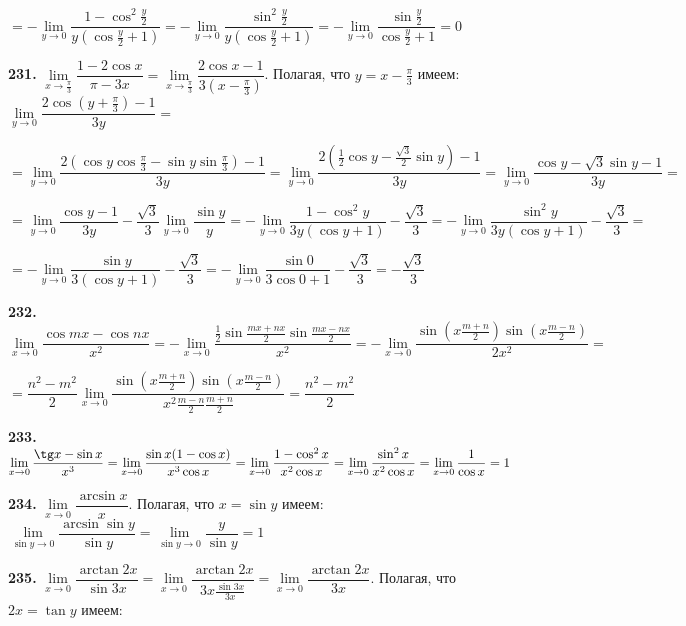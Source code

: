\documentclass[12pt]{article}
\begin{document}
	$
	= -\lim\limits_{y\to0}\dfrac{1-\cos^2\frac{y}{2}}{y(\cos\frac{y}{2}+1)} = - \lim\limits_{y\to0} \dfrac{\sin^2\frac{y}{2}}{y(\cos\frac{y}{2}+1)} = -\lim\limits_{y\to0} \dfrac{\sin \frac{y}{2}}{\cos \frac{y}{2}+1} = 0
	$
	
	\medskip
	{\bf 231.} $\lim\limits_{x\to\frac{\pi}{3}}\dfrac{1-2\cos x}{\pi -3x} = \lim\limits_{x\to\frac{\pi}{3}}\dfrac{2\cos x -1}{3(x-\frac{\pi}{3})}$. Полагая, что $y=x-\frac{\pi}{3}$ имеем: $\lim\limits_{y\to0} \dfrac{2\cos (y+\frac{\pi}{3})-1}{3y} = $
	
	$
	 = \lim\limits_{y\to0} \dfrac{2(\cos y \cos \frac{\pi}{3} - \sin y \sin \frac{\pi}{3})-1}{3y} = \lim\limits_{y\to0} \dfrac{2(\frac{1}{2}\cos y - \frac{\sqrt{3}}{2}\sin y)-1}{3y} = \lim\limits_{y\to0} \dfrac{\cos y - \sqrt{3}\sin y-1}{3y} = 
	$
	
	$
	 = \lim\limits_{y\to0} \dfrac{\cos y - 1}{3y} - \dfrac{\sqrt{3}}{3}\lim\limits_{y\to0} \dfrac{\sin y}{y} = -\lim\limits_{y\to0} \dfrac{1-\cos^2 y}{3y(\cos y+1)} - \dfrac{\sqrt{3}}{3} = -\lim\limits_{y\to0}\dfrac{\sin^2 y}{3y(\cos y+1)}-\dfrac{\sqrt{3}}{3} = 
	$
	
	$
	= -\lim\limits_{y\to0} \dfrac{\sin y}{3(\cos y + 1)} - \dfrac{\sqrt{3}}{3} = -\lim\limits_{y\to0} \dfrac{\sin 0}{3\cos 0 + 1} - \dfrac{\sqrt{3}}{3} = -\dfrac{\sqrt{3}}{3}
	$
	
	\medskip
	{\bf 232.} $\lim\limits_{x\to0}\dfrac{\cos mx- \cos nx}{x^2} = -\lim\limits_{x\to0} \dfrac{\frac{1}{2}\sin \frac{mx+nx}{2}\sin \frac{mx-nx}{2}}{x^2} = -\lim\limits_{x\to0} \dfrac{\sin (x\frac{m+n}{2})\sin (x\frac{m-n}{2})}{2x^2} = $
	
	$
	= \dfrac{n^2-m^2}{2} \lim\limits_{x\to0} \dfrac{\sin (x\frac{m+n}{2})\sin(x\frac{m-n}{2})}{x^2\frac{m-n}{2}\frac{m+n}{2}} = \dfrac{n^2-m^2}{2}
	$
	
	\medskip
	{\bf 233.} $\lim\limits_{x\to0}\dfrac{\tg x-\sin x}{x^3} = \lim\limits_{x\to0} \dfrac{\sin x(1-\cos x)}{x^3\cos x} = \lim\limits_{x\to0} \dfrac{1-\cos^2 x}{x^2\cos x} = \lim\limits_{x\to0} \dfrac{\sin^2 x}{x^2\cos x} = \lim\limits_{x\to0} \dfrac{1}{\cos x} = 1$
	
	\medskip
	{\bf 234.} $\lim\limits_{x\to0}\dfrac{\arcsin x}{x}$. Полагая, что $x=\sin y$ имеем: $\lim\limits_{\sin y\to0} \dfrac{\arcsin\sin y}{\sin y} = \lim\limits_{\sin y\to0}\dfrac{y}{\sin y}=  1$
	
	\medskip
	{\bf 235.} $\lim\limits_{x\to0}\dfrac{\arctan 2x}{\sin 3x} = \lim\limits_{x\to0} \dfrac{\arctan 2x}{3x \frac{\sin 3x}{3x}} = \lim\limits_{x\to0} \dfrac{\arctan2x}{3x}$. Полагая, что $2x=\tan y$ имеем: 
	
\end{document}
